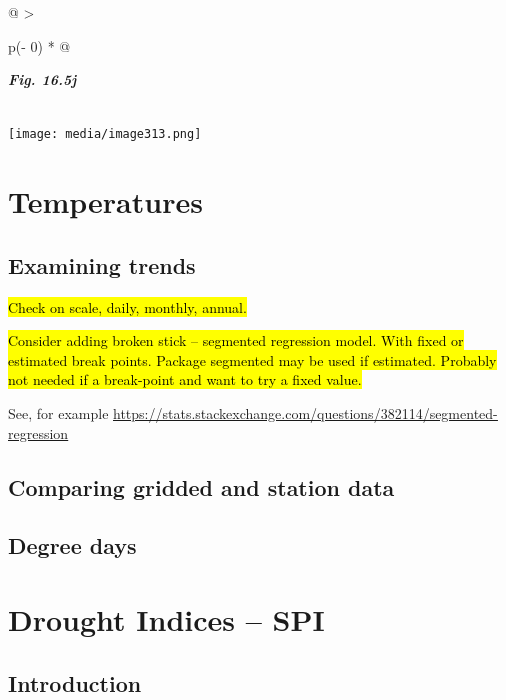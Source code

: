 \documentclass[
  letterpaper,
  DIV=11,
  numbers=noendperiod]{scrreprt}
\begin{document}
\begin{longtable}[]{@{}
  >{\raggedright\arraybackslash}p{(\columnwidth - 0\tabcolsep) * }@{}}
\toprule\noalign{}
\begin{minipage}[b]{\linewidth}\raggedright
\textbf{\emph{Fig. 16.5j}}
\end{minipage} \\
\midrule\noalign{}
\endhead
\bottomrule\noalign{}
\endlastfoot
\texttt{[image: media/image313.png]} \\
\end{longtable}


\chapter{Temperatures}\label{temperatures}

\section{Examining trends}\label{examining-trends}

\hl{Check on scale, daily, monthly, annual.}

\hl{Consider adding broken stick -- segmented regression model. With
fixed or estimated break points. Package segmented may be used if
estimated. Probably not needed if a break-point and want to try a fixed
value.}

See, for example
\href{https://stats.stackexchange.com/questions/382114/segmented-regression}{\ul{https://stats.stackexchange.com/questions/382114/segmented-regression}}

\section{Comparing gridded and station
data}\label{comparing-gridded-and-station-data}

\section{Degree days}\label{degree-days}


\chapter{Drought Indices -- SPI}\label{drought-indices-spi}

\section{Introduction}\label{introduction-14}
\end{document}
